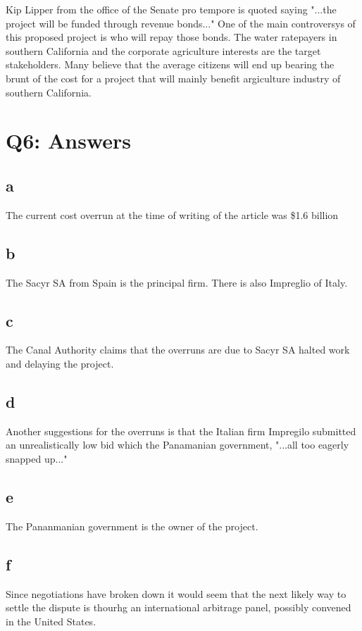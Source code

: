 \documentclass[12pt]{article} %
\begin{document}
			Kip Lipper from the office of the Senate pro tempore is quoted saying "...the project will be funded through revenue bonds..." One of the main controversys of this proposed project is who will repay those bonds. The water ratepayers in southern California and the corporate agriculture interests are the target stakeholders. Many believe that the average citizens will end up bearing the brunt of the cost for a project that will mainly benefit argiculture industry of southern California.
\section{Q6: Answers}

	\subsection{a}
		The current cost overrun at the time of writing of the article was \$1.6 billion 
		
	\subsection{b}
		The Sacyr SA from Spain is the principal firm. There is also Impreglio of Italy.
		
	\subsection{c}
		The Canal Authority claims that the overruns are due to Sacyr SA halted work and delaying the project.
		
	\subsection{d}
		Another suggestions for the overruns is that the Italian firm Impregilo submitted an unrealistically low bid which the Panamanian government, "...all too eagerly snapped up..."
		
	\subsection{e}
		The Pananmanian government is the owner of the project.
		
	\subsection{f}
		Since negotiations have broken down it would seem that the next likely way to settle the dispute is thourhg an international arbitrage panel, possibly convened in the United States.
		
\end{document}
